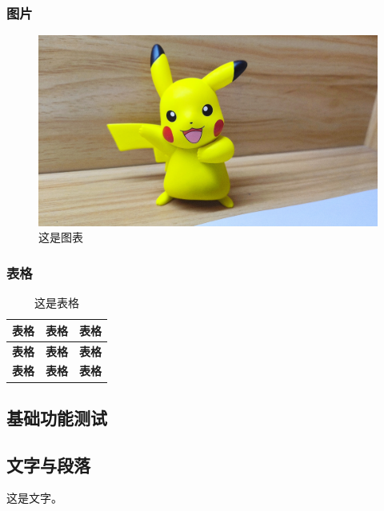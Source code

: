 \begin{ujnbody}
    \subsubsection{图片}

    \begin{figure}[htbp]
        \centering
        \includegraphics[scale=0.1, ]{figures/pikachu.jpg}
        \caption{这是图表}
    \end{figure}

    \subsubsection{表格}

    \begin{table}[htbp]
        \centering
        \caption{这是表格}
        \begin{tabular}{|c|c|c|}
            \hline
            \multicolumn{1}{|c|}{\textbf{表格}} & \multicolumn{1}{c|}{\textbf{表格}} & \multicolumn{1}{c|}{\textbf{表格}} \\ \hline
            \multicolumn{1}{|c|}{\textbf{表格}} & \multicolumn{1}{c|}{\textbf{表格}} & \multicolumn{1}{c|}{\textbf{表格}} \\ \hline
            \multicolumn{1}{|c|}{\textbf{表格}} & \multicolumn{1}{c|}{\textbf{表格}} & \multicolumn{1}{c|}{\textbf{表格}} \\ \hline
        \end{tabular}
    \end{table}
    \subsection{基础功能测试}
    \subsection{文字与段落}
    这是文字。


\end{ujnbody}
